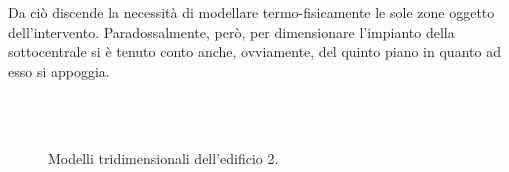 Da ciò discende la necessità di modellare termo-fisicamente le sole zone oggetto dell'intervento. Paradossalmente, però, per dimensionare l'impianto della sottocentrale si è tenuto conto anche, ovviamente, del quinto piano in quanto ad esso si appoggia.

\begin{figure}
	\centering
	\\
	\\
	\caption{Modelli tridimensionali dell'edificio 2.}\label{IFC}
\end{figure}

